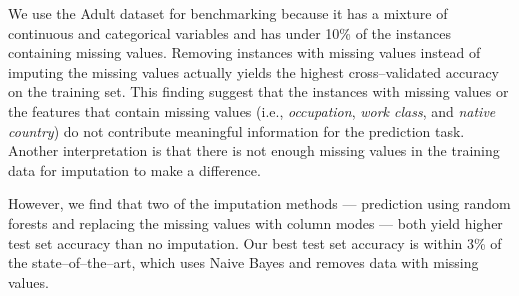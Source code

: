 \documentclass[10pt,twocolumn,letterpaper]{article}
\begin{document}
We use the Adult dataset for benchmarking because it has a mixture of continuous and categorical variables and has under 10\% of the instances containing missing values. Removing instances with missing values instead of imputing the missing values actually yields the highest cross--validated accuracy on the training set. This finding suggest that the instances with missing values or the features that contain missing values (i.e., \textit{occupation}, \textit{work class}, and \textit{native country}) do not contribute meaningful information for the prediction task. Another interpretation is that there is not enough missing values in the training data for imputation to make a difference.

However, we find that two of the imputation methods --- prediction using random forests and replacing the missing values with column modes --- both yield higher test set accuracy than no imputation. Our best test set accuracy is within 3\% of the state--of--the--art, which uses Naive Bayes and removes data with missing values. 


{\small


}
\end{document}
